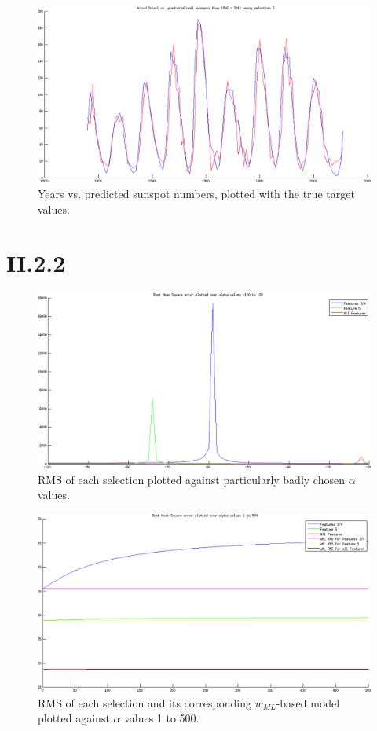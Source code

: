 \begin{figure}[!ht]
	\includegraphics[width=\linewidth]{img/II_2_1_sel3.png}
    \caption{Years vs. predicted sunspot numbers, plotted with
    the true target values.\label{fig:II_2_1_sel3}}
\end{figure}

\FloatBarrier
\section*{II.2.2}
\begin{figure}[!ht]
	\includegraphics[width=\linewidth]{img/II_2_2_bad.png}
    \caption{RMS of each selection plotted against particularly badly chosen
    $\alpha$ values.\label{fig:II_2_2_bad}}
\end{figure}

\begin{figure}[!ht]
	\includegraphics[width=\linewidth]{img/II_2_2_good.png}
    \caption{RMS of each selection and its corresponding $w_{ML}$-based model plotted against $\alpha$ values 1 to 500.\label{fig:II_2_2_good}}
\end{figure}

